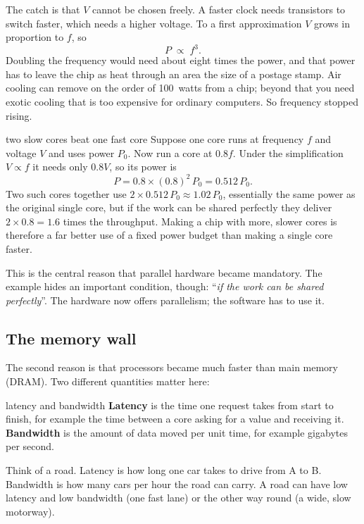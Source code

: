 The catch is that $V$ cannot be chosen freely. A faster clock needs transistors to switch faster, which needs a
higher voltage. To a first approximation $V$ grows in proportion to $f$, so
\[
  P \;\propto\; f^{3}.
\]
Doubling the frequency would need about eight times the power, and that power has to leave the
chip as heat through an area the size of a postage stamp. Air cooling can remove on the order of
100~watts from a chip; beyond that you need exotic cooling that is too expensive for ordinary computers.
So frequency stopped rising.

\begin{workedex}{two slow cores beat one fast core}
Suppose one core runs at frequency $f$ and voltage $V$ and uses power $P_0$. Now run a core at
$0.8f$. Under the simplification $V \propto f$ it needs only $0.8V$, so its power is
\[
  P = 0.8 \times (0.8)^2 \, P_0 = 0.512\,P_0 .
\]
Two such cores together use $2\times 0.512\,P_0 \approx 1.02\,P_0$, essentially the same power as the
original single core, but if the work can be shared perfectly they deliver $2\times 0.8 = 1.6$
times the throughput. Making a chip with more, slower cores is therefore a far better use of a fixed power budget than
making a single core faster.
\end{workedex}

This is the central reason that parallel hardware became mandatory. The example hides an
important condition, though: ``\emph{if the work can be shared perfectly}''. The hardware
now offers parallelism; the software has to use it.

\subsection{The memory wall}

The second reason is that processors became much faster than main memory (DRAM). Two different
quantities matter here:

\begin{definition}{latency and bandwidth}
\textbf{Latency} is the time one request takes from start to finish, for example the time
between a core asking for a value and receiving it. \textbf{Bandwidth} is the amount of data
moved per unit time, for example gigabytes per second.
\end{definition}

\begin{intuition}
Think of a road. Latency is how long one car takes to drive from A to B. Bandwidth is how many cars
per hour the road can carry. A road can have low latency and low bandwidth (one fast lane) or the other way round
(a wide, slow motorway).
\end{intuition}

